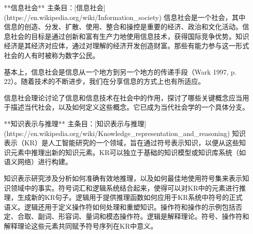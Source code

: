 **信息社会**  
主条目：[信息社会](https://en.wikipedia.org/wiki/Information_society)  
信息社会是一个社会，其中信息的创造、分发、扩散、使用、整合和操控是重要的经济、政治和文化活动。信息社会的目标是通过创新和富有生产力地使用信息技术，获得国际竞争优势。知识经济是其经济对应体，通过对理解的经济开发创造财富。那些有能力参与这一形式社会的人有时被称为数字公民。

基本上，信息社会是信息从一个地方到另一个地方的传递手段（Wark 1997, p. 22）。随着技术的不断进步，我们在分享信息的方式上也有所适应。

信息社会理论讨论了信息和信息技术在社会中的作用，探讨了哪些关键概念应当用于描述当代社会，以及如何定义这些概念。它已成为当代社会学的一个具体分支。

**知识表示与推理**  
主条目：[知识表示与推理](https://en.wikipedia.org/wiki/Knowledge_representation_and_reasoning)  
知识表示（KR）是人工智能研究的一个领域，旨在通过符号表示知识，以便从这些知识元素中推理出新的知识元素。KR可以独立于基础的知识模型或知识库系统（如语义网络）进行构建。

知识表示研究涉及分析如何准确有效地推理，以及如何最佳地使用符号集来表示知识领域中的事实。符号词汇和逻辑系统结合起来，使得可以对KR中的元素进行推理，生成新的KR句子。逻辑用于提供推理函数如何应用于KR系统中符号的正式语义。逻辑还用于定义操作符如何处理和重塑知识。操作符和操作的示例包括否定、合取、副词、形容词、量词和模态操作符。逻辑是解释理论。符号、操作符和解释理论这些元素共同赋予符号序列在KR中意义。